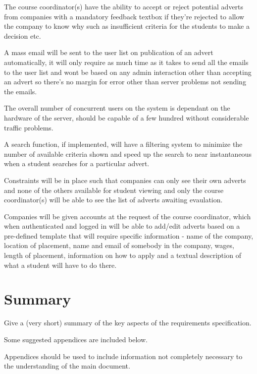 \documentclass{l3deliverable}
\begin{document}
The course coordinator(s) have the ability to accept or reject potential adverts from companies with a mandatory feedback textbox if they're rejected to allow the company to know why such as insufficient criteria for the students to make a decision etc.

A mass email will be sent to the user list on publication of an advert automatically, it will only require as much time as it takes to send all the emails to the user list and wont be based on any admin interaction other than accepting an advert so there's no margin for error other than server problems not sending the emails.

The overall number of concurrent users on the system is dependant on the hardware of the server, should be capable of a few hundred without considerable traffic problems.

A search function, if implemented, will have a filtering system to minimize the number of available criteria shown and speed up the search to near instantaneous when a student searches for a particular advert.

Constraints will be in place such that companies can only see their own adverts and none of the others available for student viewing and only the course coordinator(s) will be able to see the list of adverts awaiting evaulation.

Companies will be given accounts at the request of the course coordinator, which when authenticated and logged in will be able to add/edit adverts based on a pre-defined template that will require specific information - name of the company, location of placement, name and email of somebody in the company, wages, length of placement, information on how to apply and a textual description of what a student will have to do there.


\section{Summary}

Give a (very short) summary of the key aspects of the requirements
specification.


\appendix

Some suggested appendices are included below.

Appendices should be used to include information not completely
necessary to the understanding of the main document.
\end{document}
